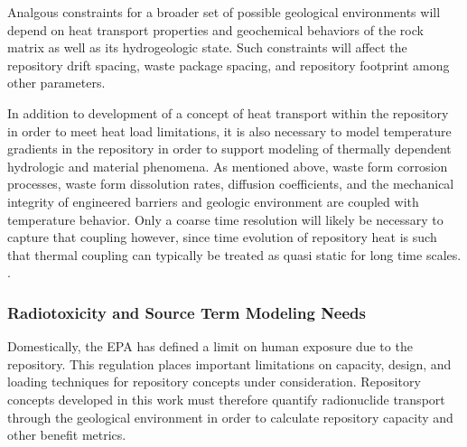 Analgous constraints for a broader set of possible geological environments will 
depend on heat transport properties and geochemical behaviors of the rock matrix 
as well as its hydrogeologic state.  Such constraints will affect the  
repository drift spacing, waste package spacing, and repository footprint among 
other parameters. 


In addition to development of a concept of heat transport within the repository 
in order to meet heat load limitations, it is also necessary to model 
temperature gradients in the repository in  order to support modeling of 
thermally dependent hydrologic and material phenomena.  As mentioned above, 
waste form corrosion processes, waste form
dissolution rates, diffusion coefficients, and the mechanical integrity of 
engineered barriers and geologic environment are coupled with temperature 
behavior. 
Only a coarse time resolution will likely be necessary to capture that coupling 
however, since time evolution of repository heat is
such that thermal coupling can typically be treated as quasi static for long 
time scales.
\cite{andra_argile:_2005}. %

\subsubsection{Radiotoxicity and Source Term Modeling Needs}

Domestically, the \gls{EPA} has defined a limit on  human 
exposure due to the repository. This regulation places important limitations on 
capacity, design, and loading techniques for repository concepts under 
consideration. Repository concepts developed in this work must therefore 
quantify radionuclide transport through the geological environment in order to 
calculate repository capacity and other benefit metrics. 

